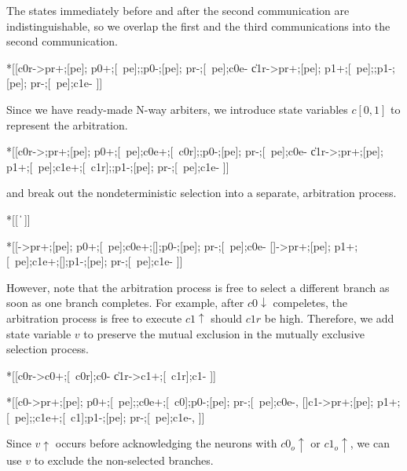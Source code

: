 \documentclass{article}
\begin{document}
\noindent
The states immediately before and after the second communication are 
indistinguishable, so we overlap the first and the third communications into 
the second communication.

\begin{hse}
*[[c0r->pr+;[pe];
    p0+;[~pe];;p0-;[pe];
    pr-;[~pe];c0e-
  \|c1r->pr+;[pe];
    p1+;[~pe];;p1-;[pe];
    pr-;[~pe];c1e-
 ]]
\end{hse}

\noindent
Since we have ready-made N-way arbiters, we introduce state variables $c[0,1]$
to represent the arbitration.

\begin{hse}
*[[c0r->;pr+;[pe];
    p0+;[~pe];c0e+;[~c0r];;p0-;[pe];
    pr-;[~pe];c0e-
  \|c1r->;pr+;[pe];
    p1+;[~pe];c1e+;[~c1r];;p1-;[pe];
    pr-;[~pe];c1e-
 ]]
\end{hse}

\noindent
and break out the nondeterministic selection into a separate, arbitration process.

\begin{hse}
*[[
  \|
 ]]

*[[->pr+;[pe];
    p0+;[~pe];c0e+;[];p0-;[pe];
    pr-;[~pe];c0e-
  []->pr+;[pe];
    p1+;[~pe];c1e+;[];p1-;[pe];
    pr-;[~pe];c1e-
 ]]
\end{hse}

\noindent
However, note that the arbitration process is free to select a different branch
as soon as one branch completes. For example, after $c0\!\downarrow$ compeletes,
the arbitration process is free to execute $c1\!\uparrow$ should $c1r$ be high.
Therefore, we add state variable $v$ to preserve the mutual exclusion in the
mutually exclusive selection process.

\begin{hse}
*[[c0r->c0+;[~c0r];c0-
  \|c1r->c1+;[~c1r];c1-
 ]]

*[[c0->pr+;[pe];
    p0+;[~pe];;c0e+;[~c0];p0-;[pe];
    pr-;[~pe];c0e-,
  []c1->pr+;[pe];
    p1+;[~pe];;c1e+;[~c1];p1-;[pe];
    pr-;[~pe];c1e-,
 ]]
\end{hse}

\noindent
Since $v\!\uparrow$ occurs before acknowledging the neurons with $c0_o\!\uparrow$
or $c1_o\!\uparrow$, we can use $v$ to exclude the non-selected branches.
\end{document}

